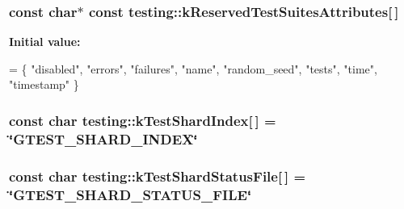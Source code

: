 {\subsubsection[{\texorpdfstring{k\+Reserved\+Test\+Suites\+Attributes}{kReservedTestSuitesAttributes}}]{\setlength{\rightskip}{0pt plus 5cm}const char$\ast$ const testing\+::k\+Reserved\+Test\+Suites\+Attributes\mbox{[}$\,$\mbox{]}\hspace{0.3cm}{\ttfamily [static]}}\hypertarget{namespacetesting_afa194c15a2ac0e03029019b0f4029968}{}\label{namespacetesting_afa194c15a2ac0e03029019b0f4029968}
{\bfseries Initial value\+:}
\begin{DoxyCode}
= \{
  \textcolor{stringliteral}{"disabled"},
  \textcolor{stringliteral}{"errors"},
  \textcolor{stringliteral}{"failures"},
  \textcolor{stringliteral}{"name"},
  \textcolor{stringliteral}{"random\_seed"},
  \textcolor{stringliteral}{"tests"},
  \textcolor{stringliteral}{"time"},
  \textcolor{stringliteral}{"timestamp"}
\}
\end{DoxyCode}
\subsubsection[{\texorpdfstring{k\+Test\+Shard\+Index}{kTestShardIndex}}]{\setlength{\rightskip}{0pt plus 5cm}const char testing\+::k\+Test\+Shard\+Index\mbox{[}$\,$\mbox{]} = \char`\"{}G\+T\+E\+S\+T\+\_\+\+S\+H\+A\+R\+D\+\_\+\+I\+N\+D\+EX\char`\"{}\hspace{0.3cm}{\ttfamily [static]}}\hypertarget{namespacetesting_a5f76dfdb8cb2664da54e320ecaba3643}{}\label{namespacetesting_a5f76dfdb8cb2664da54e320ecaba3643}
\subsubsection[{\texorpdfstring{k\+Test\+Shard\+Status\+File}{kTestShardStatusFile}}]{\setlength{\rightskip}{0pt plus 5cm}const char testing\+::k\+Test\+Shard\+Status\+File\mbox{[}$\,$\mbox{]} = \char`\"{}G\+T\+E\+S\+T\+\_\+\+S\+H\+A\+R\+D\+\_\+\+S\+T\+A\+T\+U\+S\+\_\+\+F\+I\+LE\char`\"{}\hspace{0.3cm}{\ttfamily [static]}}\hypertarget{namespacetesting_a57d3eeb1e968b4f1efc4787b2d39fbfa}{}\label{namespacetesting_a57d3eeb1e968b4f1efc4787b2d39fbfa}
}
